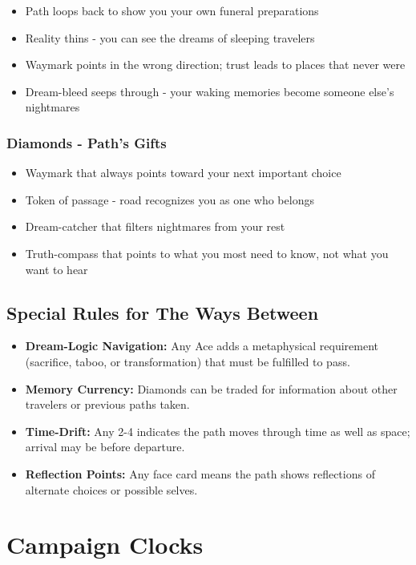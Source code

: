 \documentclass[11pt]{article}
\begin{document}
\begin{itemize}
\item Path loops back to show you your own funeral preparations
\item Reality thins - you can see the dreams of sleeping travelers
\item Waymark points in the wrong direction; trust leads to places that never were
\item Dream-bleed seeps through - your waking memories become someone else's nightmares
\end{itemize}

\subsubsection{Diamonds - Path's Gifts}

\begin{itemize}
\item Waymark that always points toward your next important choice
\item Token of passage - road recognizes you as one who belongs
\item Dream-catcher that filters nightmares from your rest
\item Truth-compass that points to what you most need to know, not what you want to hear
\end{itemize}

\subsection{Special Rules for The Ways Between}

\begin{itemize}
\item \textbf{Dream-Logic Navigation:} Any Ace adds a metaphysical requirement (sacrifice, taboo, or transformation) that must be fulfilled to pass.
\item \textbf{Memory Currency:} Diamonds can be traded for information about other travelers or previous paths taken.
\item \textbf{Time-Drift:} Any 2-4 indicates the path moves through time as well as space; arrival may be before departure.
\item \textbf{Reflection Points:} Any face card means the path shows reflections of alternate choices or possible selves.
\end{itemize}

\section{Campaign Clocks}
\end{document}
